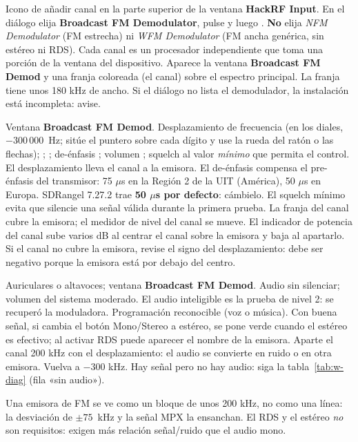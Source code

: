 {Icono de añadir canal en la parte superior de la ventana \textbf{HackRF Input}.}
{En el diálogo elija \textbf{Broadcast FM Demodulator}, pulse  y luego . \textbf{No} elija \emph{NFM Demodulator} (FM estrecha) ni \emph{WFM Demodulator} (FM ancha genérica, sin estéreo ni RDS).}
{Cada canal es un procesador independiente que toma una porción de la ventana del dispositivo.}
{Aparece la ventana \textbf{Broadcast FM Demod} y una franja coloreada (el canal) sobre el espectro principal.}
{La franja tiene unos 180 kHz de ancho.}
{Si el diálogo no lista el demodulador, la instalación está incompleta: avise.}

{Ventana \textbf{Broadcast FM Demod}.}
{Desplazamiento de frecuencia  (en los diales, $-300\,000$~Hz; sitúe el puntero sobre cada dígito y use la rueda del ratón o las flechas);  ;  ; de-énfasis ; volumen ; squelch al valor \emph{mínimo} que permita el control.}
{El desplazamiento lleva el canal a la emisora. El de-énfasis compensa el pre-énfasis del transmisor: 75 $\mu$s en la Región 2 de la UIT (América), 50 $\mu$s en Europa. SDRangel 7.27.2 trae \textbf{50 $\mu$s por defecto}: cámbielo. El squelch mínimo evita que silencie una señal válida durante la primera prueba.}
{La franja del canal cubre la emisora; el medidor de nivel del canal se mueve.}
{El indicador de potencia del canal sube varios dB al centrar el canal sobre la emisora y baja al apartarlo.}
{Si el canal no cubre la emisora, revise el signo del desplazamiento: debe ser negativo porque la emisora está por debajo del centro.}

{Auriculares o altavoces; ventana \textbf{Broadcast FM Demod}.}
{Audio sin silenciar; volumen del sistema moderado.}
{El audio inteligible es la prueba de nivel 2: se recuperó la moduladora.}
{Programación reconocible (voz o música). Con buena señal, si cambia el botón Mono/Stereo a estéreo, se pone verde cuando el estéreo es efectivo; al activar RDS puede aparecer el nombre de la emisora.}
{Aparte el canal 200 kHz con el desplazamiento: el audio se convierte en ruido o en otra emisora. Vuelva a $-300$ kHz.}
{Hay señal pero no hay audio: siga la tabla~\ref{tab:w-diag} (fila «sin audio»).}

\begin{esperado}
Una emisora de FM se ve como un bloque de unos 200 kHz, no como una línea: la desviación de $\pm75$~kHz y la señal MPX la ensanchan. El RDS y el estéreo \emph{no} son requisitos: exigen más relación señal/ruido que el audio mono.
\end{esperado}

